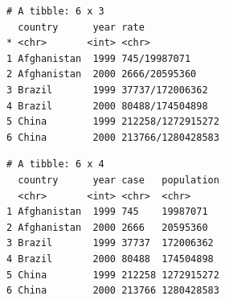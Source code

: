 \documentclass[
  11pt,
]{krantz}
\newenvironment{Shaded}{\begin{snugshade}}{\end{snugshade}}
\newcommand{\CommentTok}[1]{\textcolor[rgb]{0.37,0.37,0.37}{\textit{#1}}}
\newcommand{\DataTypeTok}[1]{\textcolor[rgb]{0.27,0.27,0.27}{#1}}
\newcommand{\DecValTok}[1]{\textcolor[rgb]{0.06,0.06,0.06}{#1}}
\newcommand{\KeywordTok}[1]{\textcolor[rgb]{0.27,0.27,0.27}{\textbf{#1}}}
\newcommand{\NormalTok}[1]{#1}
\newcommand{\OperatorTok}[1]{\textcolor[rgb]{0.43,0.43,0.43}{\textbf{#1}}}
\newcommand{\OtherTok}[1]{\textcolor[rgb]{0.37,0.37,0.37}{#1}}
\newcommand{\StringTok}[1]{\textcolor[rgb]{0.5,0.5,0.5}{#1}}
\begin{document}
\begin{verbatim}
# A tibble: 6 x 3
  country      year rate             
* <chr>       <int> <chr>            
1 Afghanistan  1999 745/19987071     
2 Afghanistan  2000 2666/20595360    
3 Brazil       1999 37737/172006362  
4 Brazil       2000 80488/174504898  
5 China        1999 212258/1272915272
6 China        2000 213766/1280428583
\end{verbatim}

\begin{Shaded}
\end{Shaded}

\begin{verbatim}
# A tibble: 6 x 4
  country      year case   population
  <chr>       <int> <chr>  <chr>     
1 Afghanistan  1999 745    19987071  
2 Afghanistan  2000 2666   20595360  
3 Brazil       1999 37737  172006362 
4 Brazil       2000 80488  174504898 
5 China        1999 212258 1272915272
6 China        2000 213766 1280428583
\end{verbatim}

\begin{Shaded}
\end{Shaded}
\end{document}

